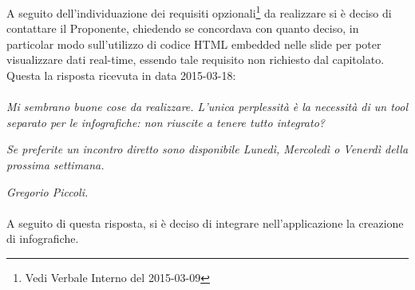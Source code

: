 A seguito dell'individuazione dei requisiti opzionali\footnote{Vedi Verbale Interno del 2015-03-09} da realizzare si è deciso di contattare il Proponente, chiedendo se concordava con quanto deciso, in particolar modo sull'utilizzo di codice HTML embedded nelle slide per poter visualizzare dati real-time, essendo tale requisito non richiesto dal capitolato. Questa la risposta ricevuta in data 2015-03-18:

\paragraph{}
\textit{Mi sembrano buone cose da realizzare. L'unica perplessità è la necessità di un tool separato per le infografiche: non riuscite a tenere tutto integrato?} 
	
\noindent \textit{Se preferite un incontro diretto sono disponibile Lunedì, Mercoledì o Venerdì della prossima settimana.}

\noindent \textit{Gregorio Piccoli.}

\paragraph{}
\noindent A seguito di questa risposta, si è deciso di integrare nell'applicazione la creazione di infografiche.